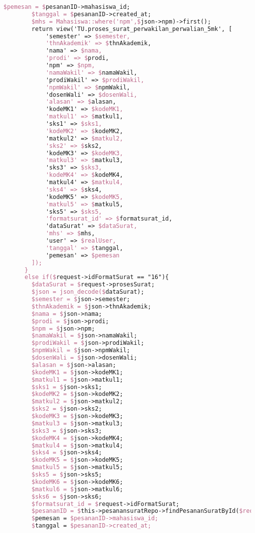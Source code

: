\begin{lstlisting}[language=tex,basicstyle=\tiny,caption=PesanansuratController.php]
        $pemesan = $pesananID->mahasiswa_id;
        $tanggal = $pesananID->created_at;
        $mhs = Mahasiswa::where('npm',$json->npm)->first();
        return view('TU.proses_surat_perwakilan_perwalian_5mk', [
            'semester' => $semester,
            'thnAkademik' => $thnAkademik,
            'nama' => $nama,
            'prodi' => $prodi,
            'npm' => $npm,
            'namaWakil' => $namaWakil,
            'prodiWakil' => $prodiWakil,
            'npmWakil' => $npmWakil,
            'dosenWali' => $dosenWali,
            'alasan' => $alasan,
            'kodeMK1' => $kodeMK1,
            'matkul1' => $matkul1,
            'sks1' => $sks1,
            'kodeMK2' => $kodeMK2,
            'matkul2' => $matkul2,
            'sks2' => $sks2,
            'kodeMK3' => $kodeMK3,
            'matkul3' => $matkul3,
            'sks3' => $sks3,
            'kodeMK4' => $kodeMK4,
            'matkul4' => $matkul4,
            'sks4' => $sks4,
            'kodeMK5' => $kodeMK5,
            'matkul5' => $matkul5,
            'sks5' => $sks5,
            'formatsurat_id' => $formatsurat_id,
            'dataSurat' => $dataSurat,
            'mhs' => $mhs,
            'user' => $realUser,
            'tanggal' => $tanggal,
            'pemesan' => $pemesan
        ]);
      }
      else if($request->idFormatSurat == "16"){
        $dataSurat = $request->prosesSurat;
        $json = json_decode($dataSurat);
        $semester = $json->semester;
        $thnAkademik = $json->thnAkademik;
        $nama = $json->nama;
        $prodi = $json->prodi;
        $npm = $json->npm;
        $namaWakil = $json->namaWakil;
        $prodiWakil = $json->prodiWakil;
        $npmWakil = $json->npmWakil;
        $dosenWali = $json->dosenWali;
        $alasan = $json->alasan;
        $kodeMK1 = $json->kodeMK1;
        $matkul1 = $json->matkul1;
        $sks1 = $json->sks1;
        $kodeMK2 = $json->kodeMK2;
        $matkul2 = $json->matkul2;
        $sks2 = $json->sks2;
        $kodeMK3 = $json->kodeMK3;
        $matkul3 = $json->matkul3;
        $sks3 = $json->sks3;
        $kodeMK4 = $json->kodeMK4;
        $matkul4 = $json->matkul4;
        $sks4 = $json->sks4;
        $kodeMK5 = $json->kodeMK5;
        $matkul5 = $json->matkul5;
        $sks5 = $json->sks5;
        $kodeMK6 = $json->kodeMK6;
        $matkul6 = $json->matkul6;
        $sks6 = $json->sks6;
        $formatsurat_id = $request->idFormatSurat;
        $pesananID = $this->pesanansuratRepo->findPesananSuratById($request->id);
        $pemesan = $pesananID->mahasiswa_id;
        $tanggal = $pesananID->created_at;

\end{lstlisting}
